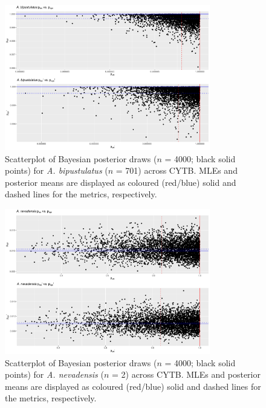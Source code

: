 \documentclass[12pt]{article}
\begin{document}
\begin{figure}[H]

\centering

\includegraphics[width=0.80\textwidth]{Figure 3}

\caption{Scatterplot of Bayesian posterior draws ($n$ = 4000; black solid points) for \textit{A. bipustulatus} ($n$ = 701) across CYTB. MLEs and posterior means are displayed as coloured (red/blue) solid and dashed lines for the metrics, respectively.}

\end{figure}

\newpage


\begin{figure}[H]

\centering

\includegraphics[width=0.80\textwidth]{Figure 4}

\caption{Scatterplot of Bayesian posterior draws ($n$ = 4000; black solid points) for \textit{A. nevadensis} ($n$ = 2) across CYTB. MLEs and posterior means are displayed as coloured (red/blue) solid and dashed lines for the metrics, respectively.}

\end{figure}
\end{document}
